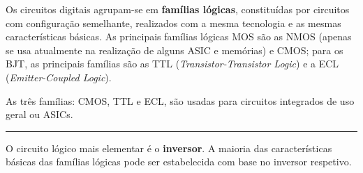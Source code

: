 \vspace{-0.5em}
\noindent Os circuitos digitais agrupam-se em \textbf{famílias lógicas}, constituídas por circuitos com configuração semelhante, realizados com a mesma tecnologia e as mesmas características básicas. As principais famílias lógicas MOS são as NMOS (apenas se usa atualmente na realização de alguns ASIC e memórias) e CMOS; para os BJT, as principais famílias são as TTL (\textit{Transistor-Transistor Logic}) e a ECL (\textit{Emitter-Coupled Logic}). 

As três famílias: CMOS, TTL e ECL, são usadas para circuitos integrados de uso geral ou ASICs. 
\vspace{1em}\hrule\vspace{1em}
\noindent O circuito lógico mais elementar é o \textbf{inversor}. A maioria das características básicas das famílias lógicas pode ser estabelecida com base no inversor respetivo.

